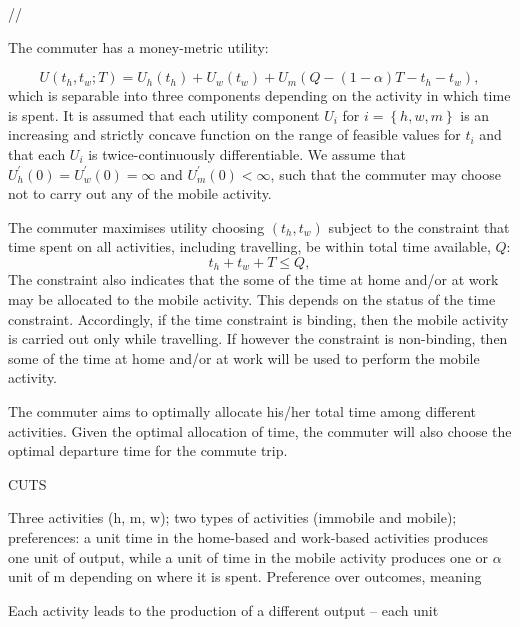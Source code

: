 \documentclass[12pt,a4paper,british]{article}
\theoremstyle{definition}
\theoremstyle{plain}
\theoremstyle{plain}
\begin{document}
//

The commuter has a money-metric utility: %

{} 
\begin{equation}
U\left(t_{h},t_{w};T\right)=U_{h}\left(t_{h}\right)+U_{w}\left(t_{w}\right)+U_{m}\left(Q-\left(1-\alpha\right)T-t_{h}-t_{w}\right),\label{utility}
\end{equation}
which is separable into three components depending on the activity
in which time is spent. It is assumed that each utility component
$U_{i}$ for $i=\left\{ h,w,m\right\} $ is an increasing and strictly
concave function on the range of feasible values for $t_{i}$ and
that each $U_{i}$ is twice-continuously differentiable. We assume
that $U_{h}^{\prime}\left(0\right)=U_{w}^{\prime}\left(0\right)=\infty$
and $U_{m}^{\prime}\left(0\right)<\infty$, such that the commuter
may choose not to carry out any of the mobile activity.

The commuter maximises utility choosing $\left(t_{h},t_{w}\right)$
subject to the constraint that time spent on all activities, including
travelling, be within total time available, $Q$: 
\begin{equation}
t_{h}+t_{w}+T\leq Q,\label{constraint}
\end{equation}
The constraint also indicates that the some of the time at home and/or
at work may be allocated to the mobile activity. This depends on the
status of the time constraint. Accordingly, if the time constraint
is binding, then the mobile activity is carried out only while travelling.
If however the constraint is non-binding, then some of the time at
home and/or at work will be used to perform the mobile activity. 

The commuter aims to optimally allocate his/her total time among different
activities. Given the optimal allocation of time, the commuter will
also choose the optimal departure time for the commute trip.

CUTS

Three activities (h, m, w); two types of activities (immobile and
mobile); preferences: a unit time in the home-based and work-based
activities produces one unit of output, while a unit of time in the
mobile activity produces one or $\alpha$ unit of m depending on where
it is spent. Preference over outcomes, meaning

Each activity leads to the production of a different output -- each
unit 
\end{document}
